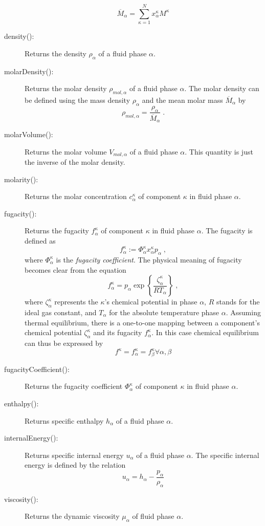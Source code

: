 \begin{description}
  \[
  \overline M_\alpha = \sum_{\kappa=1}^{N} x^\kappa_\alpha M^\kappa
  \]
\item[density():] Returns the density $\rho_\alpha$ of a
  fluid phase $\alpha$.
\item[molarDensity():] Returns the molar density
  $\rho_{mol,\alpha}$ of a fluid phase $\alpha$. The molar density can
  be defined using the mass density $\rho_\alpha$ and the mean molar mass $\overline M_\alpha$ by
  \[
  \rho_{mol,\alpha} = \frac{\rho_\alpha}{\overline M_\alpha} \;.
  \]
\item[molarVolume():] Returns the molar volume
  $V_{mol,\alpha}$ of a fluid phase $\alpha$. This quantity is just
  the inverse of the molar density.
\item[molarity():] Returns the molar concentration
  $c^\kappa_\alpha$ of component $\kappa$ in fluid
  phase $\alpha$.
\item[fugacity():] Returns the fugacity $f^\kappa_\alpha$ of
  component $\kappa$ in fluid phase $\alpha$. The fugacity is defined
  as
  \[
  f_\alpha^\kappa := \Phi^\kappa_\alpha x^\kappa_\alpha p_\alpha \;,
  \]
  where $\Phi^\kappa_\alpha$ is the {\em fugacity coefficient}. The
  physical meaning of fugacity becomes clear from the equation
  \[
  f_\alpha^\kappa = p_\alpha \exp\left\{\frac{\zeta^\kappa_\alpha}{R T_\alpha} \right\} \;,
  \]
  where $\zeta^\kappa_\alpha$ represents the $\kappa$'s chemical
  potential in phase $\alpha$, $R$ stands for the
  ideal gas constant, and $T_\alpha$ for the absolute
  temperature phase $\alpha$. Assuming thermal equilibrium, there is a
  one-to-one mapping between a component's chemical potential
  $\zeta^\kappa_\alpha$ and its fugacity $f^\kappa_\alpha$. In this
  case chemical equilibrium can thus be expressed by
  \[
  f^\kappa = f^\kappa_\alpha = f^\kappa_\beta \forall \alpha, \beta
  \]
\item[fugacityCoefficient():] Returns the fugacity coefficient $\Phi^\kappa_\alpha$ of
  component $\kappa$ in fluid phase $\alpha$.
\item[enthalpy():] Returns specific enthalpy $h_\alpha$ of a
  fluid phase $\alpha$. 
\item[internalEnergy():] Returns specific internal energy $u_\alpha$ of a
  fluid phase $\alpha$. The specific internal energy is defined by the relation
  \[
  u_\alpha = h_\alpha - \frac{p_\alpha}{\rho_\alpha}
  \]
\item[viscosity():] Returns the dynamic viscosity
  $\mu_\alpha$ of fluid phase $\alpha$.
\end{description}
  
